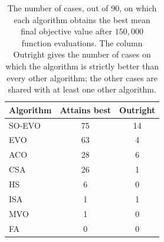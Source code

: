 \begin{table}[htbp]
\centering\small
\caption{The number of cases, out of 90, on which each algorithm obtains the best mean final objective value after $150{,}000$ function evaluations. The column Outright gives the number of cases on which the algorithm is strictly better than every other algorithm; the other cases are shared with at least one other algorithm.}
\label{tab:fixedfe_wins}
\begin{tabular}{lcc}
\toprule
Algorithm & Attains best & Outright \\
\midrule
SO-EVO & 75 & 14 \\
EVO & 63 & 4 \\
ACO & 28 & 6 \\
CSA & 26 & 1 \\
HS & 6 & 0 \\
ISA & 1 & 1 \\
MVO & 1 & 0 \\
FA & 0 & 0 \\
\bottomrule
\end{tabular}
\end{table}
